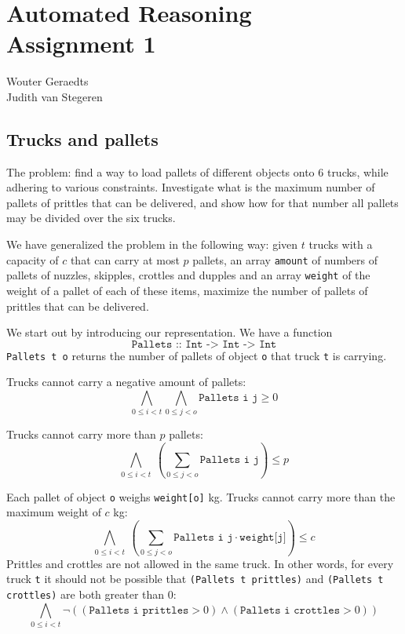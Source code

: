 \documentclass[12pt]{article}
\begin{document}
\section*{Automated Reasoning\\Assignment 1}

\begin{center}
Wouter Geraedts \\
Judith van Stegeren\\
\end{center}

\vspace{8mm}

\subsection*{Trucks and pallets}
The problem: find a way to load pallets of different objects onto 6 trucks, while adhering to various constraints. Investigate what is the maximum number of pallets of prittles that can be delivered, and show how for that number all pallets may be divided over the six trucks.

We have generalized the problem in the following way: given $t$ trucks with a capacity of $c$ that can carry at most $p$ pallets, an array \texttt{amount} of numbers of pallets of nuzzles, skipples, crottles and dupples and an array \texttt{weight} of the weight of a pallet of each of these items, maximize the number of pallets of prittles that can be delivered.

We start out by introducing our representation. We have a function 
\[\texttt{Pallets :: Int -> Int -> Int}\]
\texttt{Pallets t o} returns the number of pallets of object \texttt{o} that truck \texttt{t} is carrying.

Trucks cannot carry a negative amount of pallets:
\[ \bigwedge_{0 \le i < t} \bigwedge_{0 \le j < o} \texttt{Pallets i j} \ge 0 \]

Trucks cannot carry more than $p$ pallets:
\[ \bigwedge_{0 \le i < t} ~ ( \sum_{0 \le j < o} \texttt{Pallets i j} ) \le p \]

Each pallet of object \texttt{o} weighs \texttt{weight[o]} kg. Trucks cannot carry more than the maximum weight of $c$ kg:
\[ \bigwedge_{0 \le i < t} ~ (\sum_{0 \le j < o} \texttt{Pallets i j} \cdot \texttt{weight[j]}) \le c \]
Prittles and crottles are not allowed in the same truck. In other words, for every truck \texttt{t} it should not be possible that \texttt{(Pallets t prittles)} and \texttt{(Pallets t crottles)} are both greater than 0:
\[ \bigwedge_{0 \le i < t} \neg \left(( \texttt{Pallets i prittles} > 0) \wedge (\texttt{Pallets i crottles} > 0 )\right)\]
\end{document}
